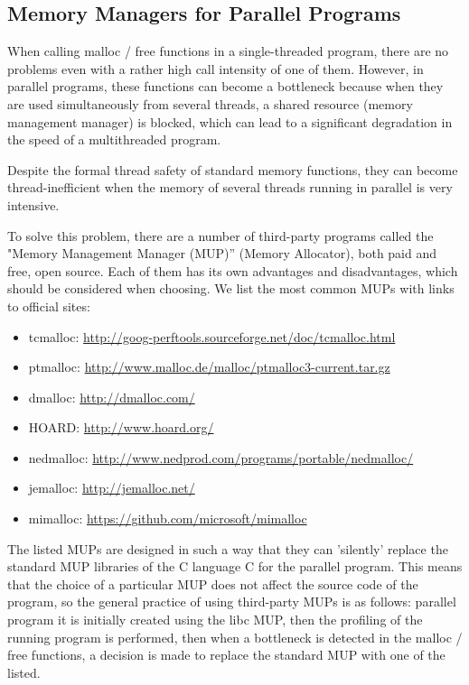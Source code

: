 { %
	\subsection{Memory Managers for Parallel Programs}
	\par When calling malloc / free functions in a single-threaded program, there are no problems even with a rather high call intensity of one of them. However, in parallel programs, these functions can become a bottleneck because when they are used simultaneously from several threads, a shared resource (memory management manager) is blocked, which can lead to a significant degradation in the speed of a multithreaded program.
	\par Despite the formal thread safety of standard memory functions, they can become thread-inefficient when the memory of several threads running in parallel is very intensive.
	\par To solve this problem, there are a number of third-party programs called the "Memory Management Manager (MUP)'' (Memory Allocator), both paid and free, open source. Each of them has its own advantages and disadvantages, which should be considered when choosing. We list the most common MUPs with links to official sites:
	\begin{itemize}
		\sloppy
		\item tcmalloc: \url{http://goog-perftools.sourceforge.net/doc/tcmalloc.html}
		\item ptmalloc: \url{http://www.malloc.de/malloc/ptmalloc3-current.tar.gz}
		\item dmalloc: \url{http://dmalloc.com/}
		\item HOARD: \url{http://www.hoard.org/}
		\item nedmalloc: \url{http://www.nedprod.com/programs/portable/nedmalloc/}
		\item jemalloc: \url{http://jemalloc.net/}
		\item mimalloc: \url{https://github.com/microsoft/mimalloc}
	\end{itemize}
	\par The listed MUPs are designed in such a way that they can 'silently' replace the standard MUP libraries of the C language C for the parallel program. This means that the choice of a particular MUP does not affect the source code of the program, so the general practice of using third-party MUPs is as follows: parallel program it is initially created using the libc MUP, then the profiling of the running program is performed, then when a bottleneck is detected in the malloc / free functions, a decision is made to replace the standard MUP with one of the listed.
	\par
	\par
}